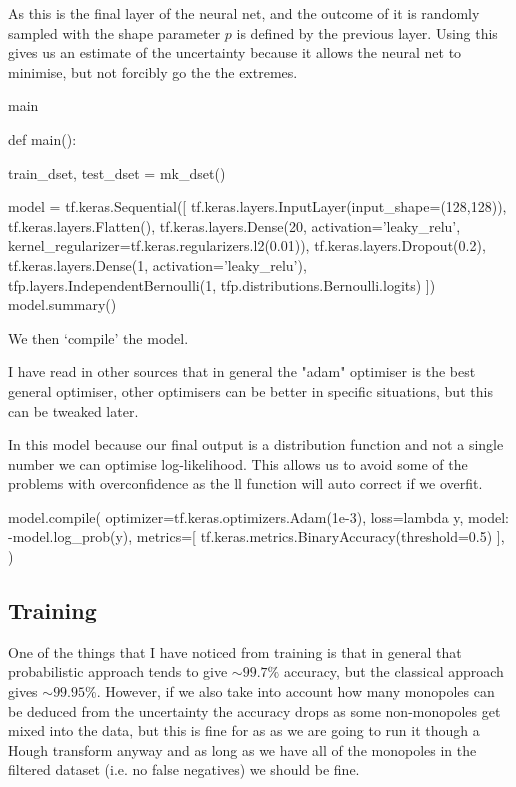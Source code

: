 \documentclass[10pt, a4paper]{article}
\begin{document}
As this is the final layer of the neural net, and the outcome of it is randomly sampled with the shape parameter $p$ is defined by the previous layer. 
Using this gives us an estimate of the uncertainty because it allows the neural net to minimise, but not forcibly go the the extremes.
\begin{codeblock}{main}
\begin{code}
def main():

	train_dset, test_dset = mk_dset()
	
	model = tf.keras.Sequential([
			tf.keras.layers.InputLayer(input_shape=(128,128)),
			tf.keras.layers.Flatten(),
			tf.keras.layers.Dense(20, activation='leaky_relu',
			                      kernel_regularizer=tf.keras.regularizers.l2(0.01)),
			tf.keras.layers.Dropout(0.2),
			tf.keras.layers.Dense(1, activation='leaky_relu'),
			tfp.layers.IndependentBernoulli(1, tfp.distributions.Bernoulli.logits)
	])
	model.summary()
\end{code}

We then `compile' the model. 

I have read in other sources that in general the "adam" optimiser is the best general optimiser, other optimisers can be better in specific situations, but this can be tweaked later. 

In this model because our final output is a distribution function and not a single number we can optimise log-likelihood. This allows us to avoid some of the problems with overconfidence as the ll function will auto correct if we overfit.


\begin{code}
	model.compile(
		optimizer=tf.keras.optimizers.Adam(1e-3),
		loss=lambda y, model: -model.log_prob(y),
		metrics=[
			tf.keras.metrics.BinaryAccuracy(threshold=0.5)
		],
	)
\end{code}

\subsection{Training}

One of the things that I have noticed from training is that in general that probabilistic approach tends to give $\sim99.7\%$ accuracy, but the classical approach gives $\sim99.95\%$. However, if we also take into account how many monopoles can be deduced from the uncertainty the accuracy drops as some non-monopoles get mixed into the data, but this is fine for as as we are going to run it though a Hough transform anyway and as long as we have all of the monopoles in the filtered dataset (i.e. no false negatives) we should be fine.


\end{codeblock}
\end{document}

